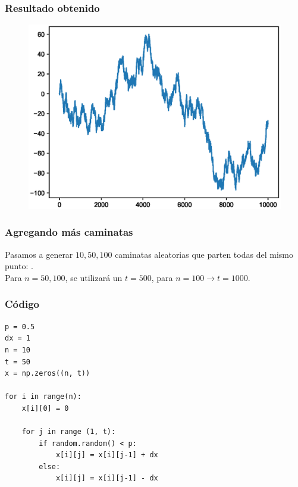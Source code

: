 \documentclass[12pt]{beamer}
\begin{document}
\begin{frame}
\frametitle{Resultado obtenido}
\begin{figure}
    \includegraphics[scale=0.55]{Imagenes/plot_caminata_aleatoria_01.eps}
\end{figure}
\end{frame}
\begin{frame}
\frametitle{Agregando más caminatas}
Pasamos a generar $10, 50, 100$ caminatas aleatorias que parten todas del mismo punto: .
\\
\bigskip
\pause
Para $n = 50, 100$, se utilizará un $t = 500$, para $n = 100 \rightarrow t = 1000$.
\end{frame}
\begin{frame}
\frametitle{Código}
\begin{lstlisting}[caption=Código para las caminatas]
p = 0.5
dx = 1
n = 10
t = 50
x = np.zeros((n, t))

for i in range(n):
    x[i][0] = 0
    
    for j in range (1, t):
        if random.random() < p:
            x[i][j] = x[i][j-1] + dx
        else:
            x[i][j] = x[i][j-1] - dx
\end{lstlisting}
\end{frame}
\end{document}
